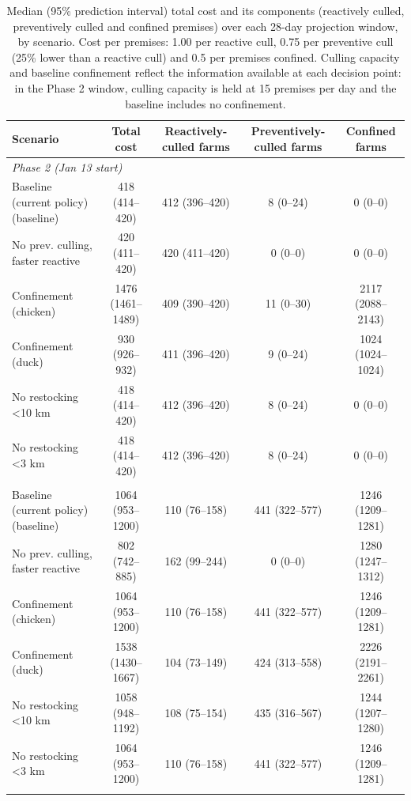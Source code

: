 \begin{table}[t]
\centering
\caption{Median (95\% prediction interval) total cost and its components
(reactively culled, preventively culled and confined premises) over each
28-day projection window, by scenario. Cost per premises: 1.00 per reactive
cull, 0.75 per preventive cull (25\% lower than a reactive cull) and 0.5
per premises confined. Culling capacity and baseline confinement reflect the information available at each decision point: in the Phase 2 window, culling capacity is held at 15 premises per day and the baseline includes no confinement.}
\label{tab:scenario_cost_summary}
\begin{tabular}{lcccc}
\toprule
Scenario & Total cost & Reactively-culled farms & Preventively-culled farms & Confined farms \\
\midrule
\multicolumn{5}{l}{\textit{Phase 2 (Jan 13 start)}} \\
\quad Baseline (current policy) (baseline) & 418 (414--420) & 412 (396--420) & 8 (0--24) & 0 (0--0) \\
\quad No prev. culling, faster reactive & 420 (411--420) & 420 (411--420) & 0 (0--0) & 0 (0--0) \\
\quad Confinement (chicken) & 1476 (1461--1489) & 409 (390--420) & 11 (0--30) & 2117 (2088--2143) \\
\quad Confinement (duck) & 930 (926--932) & 411 (396--420) & 9 (0--24) & 1024 (1024--1024) \\
\quad No restocking <10 km & 418 (414--420) & 412 (396--420) & 8 (0--24) & 0 (0--0) \\
\quad No restocking <3 km & 418 (414--420) & 412 (396--420) & 8 (0--24) & 0 (0--0) \\
\addlinespace
\multicolumn{5}{l}{\textit{Phase 3 (Feb 14 start)}} \\
\quad Baseline (current policy) (baseline) & 1064 (953--1200) & 110 (76--158) & 441 (322--577) & 1246 (1209--1281) \\
\quad No prev. culling, faster reactive & 802 (742--885) & 162 (99--244) & 0 (0--0) & 1280 (1247--1312) \\
\quad Confinement (chicken) & 1064 (953--1200) & 110 (76--158) & 441 (322--577) & 1246 (1209--1281) \\
\quad Confinement (duck) & 1538 (1430--1667) & 104 (73--149) & 424 (313--558) & 2226 (2191--2261) \\
\quad No restocking <10 km & 1058 (948--1192) & 108 (75--154) & 435 (316--567) & 1244 (1207--1280) \\
\quad No restocking <3 km & 1064 (953--1200) & 110 (76--158) & 441 (322--577) & 1246 (1209--1281) \\
\addlinespace
\bottomrule
\end{tabular}
\end{table}

